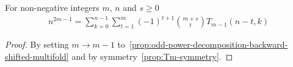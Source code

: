 \begin{corollary}
    \label{cor:odd-power-decomposition-m-1-shifted-multifold}
    For non-negative integers $m$, $n$ and $s \geq 0$
    \begin{align*}
        n^{2m-1} = \sum_{k=0}^{n-1} \sum_{t=1}^{m} (-1)^{t+1} \binom{m+s}{t} T_{m-1} (n-t, k)
    \end{align*}
    \begin{proof}
        By setting $m \rightarrow m-1$ to~\eqref{prop:odd-power-decomposition-backward-shifted-multifold}
        and by symmetry~\eqref{prop:Tm-symmetry}.
    \end{proof}
\end{corollary}
